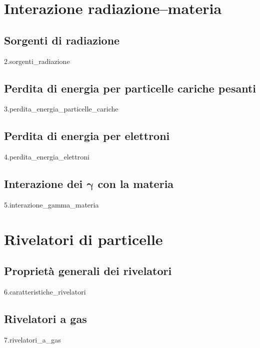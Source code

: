 \documentclass[12pt,openany]{book}
\newcommand\blankpage{%
    \null
    \thispagestyle{empty}%
    \newpage} %
\begin{document}
\part{Interazione radiazione--materia}

\chapter{Sorgenti di radiazione}
{2.sorgenti_radiazione}

\chapter{Perdita di energia per particelle cariche pesanti}
{3.perdita_energia_particelle_cariche}

\afterpage{\blankpage}
\newpage

\chapter{Perdita di energia per elettroni}
{4.perdita_energia_elettroni}

\afterpage{\blankpage}
\newpage

\chapter[Interazione dei \texorpdfstring{$\gamma$}{\textgamma} con la materia]
{Interazione dei $\boldsymbol{\gamma}$ con la materia}
{5.interazione_gamma_materia}

\afterpage{\blankpage}
\newpage

\part{Rivelatori di particelle}

\chapter{Proprietà generali dei rivelatori}\label{chap:caratteristiche_rivelatori}
{6.caratteristiche_rivelatori}

\chapter{Rivelatori a gas}
{7.rivelatori_a_gas}

\afterpage{\blankpage}
\newpage
\end{document}

